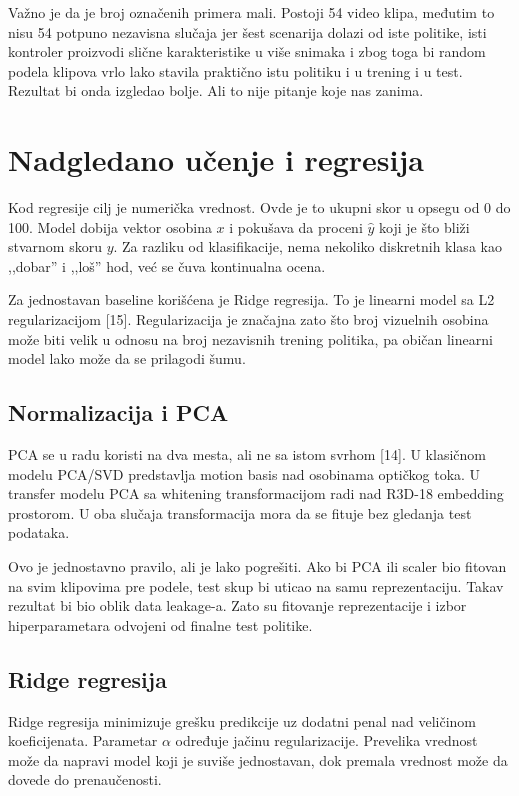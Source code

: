 \documentclass[12pt,a4paper]{report}
\begin{document}
Važno je da je broj označenih primera mali. Postoji 54 video klipa, međutim
to nisu 54 potpuno nezavisna slučaja jer šest scenarija dolazi od iste politike,
isti kontroler proizvodi slične karakteristike u više snimaka i zbog toga bi
random podela klipova vrlo lako stavila praktično istu politiku i u trening i u
test. Rezultat bi onda izgledao bolje. Ali to nije pitanje koje nas zanima.

\section{Nadgledano učenje i regresija}

Kod regresije cilj je numerička vrednost. Ovde je to ukupni skor u opsegu od 0
do 100. Model dobija vektor osobina $x$ i pokušava da proceni $\hat{y}$ koji je
što bliži stvarnom skoru $y$. Za razliku od klasifikacije, nema nekoliko
diskretnih klasa kao ,,dobar'' i ,,loš'' hod, već se čuva kontinualna ocena.

Za jednostavan baseline korišćena je Ridge regresija. To je linearni model sa
L2 regularizacijom [15]. Regularizacija je značajna zato što broj vizuelnih osobina
može biti velik u odnosu na broj nezavisnih trening politika, pa običan linearni
model lako može da se prilagodi šumu.

\subsection{Normalizacija i PCA}

PCA se u radu koristi na dva mesta, ali ne sa istom svrhom [14]. U klasičnom modelu
PCA/SVD predstavlja motion basis nad osobinama optičkog toka. U transfer modelu
PCA sa whitening transformacijom radi nad R3D-18 embedding prostorom. U oba
slučaja transformacija mora da se fituje bez gledanja test podataka.

Ovo je jednostavno pravilo, ali je lako pogrešiti. Ako bi PCA ili scaler bio
fitovan na svim klipovima pre podele, test skup bi uticao na samu
reprezentaciju. Takav rezultat bi bio oblik data leakage-a. Zato su fitovanje
reprezentacije i izbor hiperparametara odvojeni od finalne test politike.

\subsection{Ridge regresija}

Ridge regresija minimizuje grešku predikcije uz dodatni penal nad veličinom
koeficijenata. Parametar $\alpha$ određuje jačinu regularizacije. Prevelika
vrednost može da napravi model koji je suviše jednostavan, dok premala vrednost
može da dovede do prenaučenosti.
\end{document}
